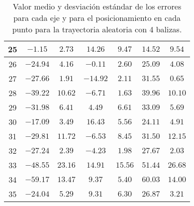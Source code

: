 \begin{table}[H]
\begin{tabular}{|c|c|c|c|c|c|c|}
                        25  &   $-1.15$   &  $2.73$   &   $14.26$   &  $9.47$  &  $14.52$   &  $9.54$   \\ \hline
                        26  &   $-24.94$  &  $4.16$   &   $-0.11$   &  $2.60$  &  $25.09$   &  $4.08$   \\ \hline
                        27  &   $-27.66$  &  $1.91$   &   $-14.92$  &  $2.11$  &  $31.55$   &  $0.65$   \\ \hline
                        28  &   $-39.22$  &  $10.62$  &   $-6.71$   &  $1.63$  &  $39.96$   &  $10.10$  \\ \hline
                        29  &   $-31.98$  &  $6.41$   &   $4.49$    &  $6.61$  &  $33.09$   &  $5.69$   \\ \hline
                        30  &   $-17.09$  &  $3.49$   &   $16.43$   &  $5.56$  &  $24.11$   &  $4.91$   \\ \hline
                        31  &   $-29.81$  &  $11.72$  &   $-6.53$   &  $8.45$  &  $31.50$   &  $12.15$  \\ \hline
                        32  &   $-27.24$  &  $2.39$   &   $-4.23$   &  $1.98$  &  $27.67$   &  $2.03$   \\ \hline
                        33  &   $-48.55$  &  $23.16$  &   $14.91$   &  $15.56$ &  $51.44$   &  $26.68$  \\ \hline
                        34  &   $-59.17$  &  $13.47$  &   $9.37$    &  $5.40$  &  $60.03$   &  $14.00$  \\ \hline
                        35  &   $-24.04$  &  $5.29$   &   $9.31$    &  $6.30$  &  $26.87$   &  $3.21$   \\ \hline
        \end{tabular}
    \caption{Valor medio y desviación estándar de los errores para cada eje y para el posicionamiento en cada punto para la trayectoria aleatoria con 4 balizas.}
    \label{tab:media_lab_4_aleatoria} 
\end{table}

